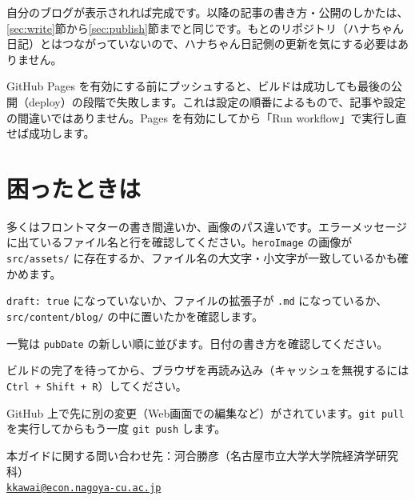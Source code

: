 \documentclass[a4paper,11pt]{ltjsarticle}
\newcommand{\file}[1]{\texttt{#1}}
\begin{document}
自分のブログが表示されれば完成です。以降の記事の書き方・公開のしかたは、\ref{sec:write}節から\ref{sec:publish}節までと同じです。もとのリポジトリ（ハナちゃん日記）とはつながっていないので、ハナちゃん日記側の更新を気にする必要はありません。

\begin{hint}
GitHub Pages を有効にする前にプッシュすると、ビルドは成功しても最後の公開（deploy）の段階で失敗します。これは設定の順番によるもので、記事や設定の間違いではありません。Pages を有効にしてから「Run workflow」で実行し直せば成功します。
\end{hint}

\section{困ったときは}\label{sec:trouble}

\begin{description}[style=nextline,leftmargin=1em]
  \item[Actions が赤い×になった]
    多くはフロントマターの書き間違いか、画像のパス違いです。エラーメッセージに出ているファイル名と行を確認してください。\file{heroImage} の画像が \file{src/assets/} に存在するか、ファイル名の大文字・小文字が一致しているかも確かめます。
  \item[記事が一覧に出てこない]
    \file{draft: true} になっていないか、ファイルの拡張子が \file{.md} になっているか、\file{src/content/blog/} の中に置いたかを確認します。
  \item[記事の順番がおかしい]
    一覧は \file{pubDate} の新しい順に並びます。日付の書き方を確認してください。
  \item[プッシュしたのに表示が変わらない]
    ビルドの完了を待ってから、ブラウザを再読み込み（キャッシュを無視するには \texttt{Ctrl + Shift + R}）してください。
  \item[\file{git push} が拒否された]
    GitHub 上で先に別の変更（Web画面での編集など）がされています。\file{git pull} を実行してからもう一度 \file{git push} します。
\end{description}

\bigskip
\begin{center}
\small
本ガイドに関する問い合わせ先：河合勝彦（名古屋市立大学大学院経済学研究科）\\
\href{mailto:kkawai@econ.nagoya-cu.ac.jp}{\texttt{kkawai@econ.nagoya-cu.ac.jp}}
\end{center}
\end{document}
